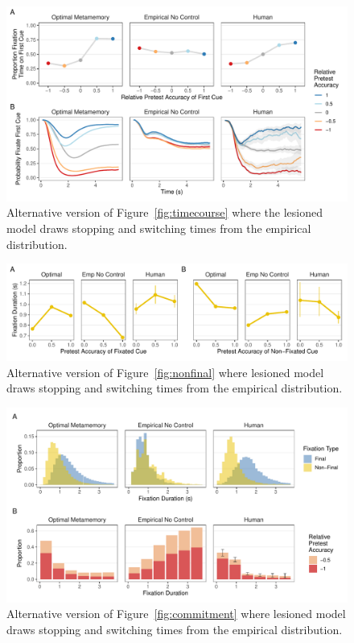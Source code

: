 \begin{figure}[ht]
  \centering
  \includegraphics[scale=.75]{figs/memory/exp2_alt/overall_timecourse.pdf}
  \caption{Alternative version of Figure~\ref{fig:timecourse} where the lesioned model draws stopping and switching times from the empirical distribution.}
  \label{fig:timecourse_alt}
\end{figure}

\begin{figure}[t]
  \includegraphics[scale=.75]{figs/memory/exp2_alt/nonfinal.pdf}
  \caption{Alternative version of Figure~\ref{fig:nonfinal} where lesioned model draws stopping and switching times from the empirical distribution.}
  \label{fig:nonfinal_alt}
\end{figure}

\begin{figure}[t]
  \includegraphics[scale=.75]{figs/memory/exp2_alt/commitment.pdf}
  \caption{Alternative version of Figure~\ref{fig:commitment} where lesioned model draws stopping and switching times from the empirical distribution.}
  \label{fig:commitment_alt}
\end{figure}


